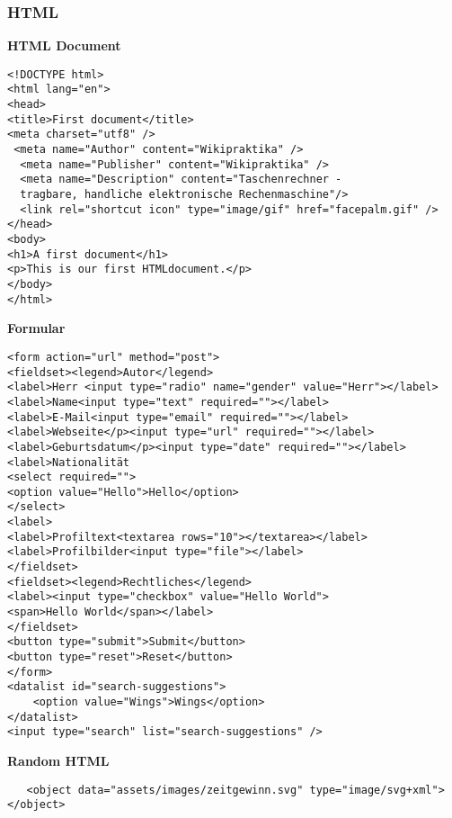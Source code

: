 

\thispagestyle{fancy}
\raggedright
\footnotesize
\raggedcolumns
\begin{multicols*}{4}
\setlength{\premulticols}{1pt}
\setlength{\postmulticols}{1pt}
\setlength{\multicolsep}{1pt}
\setlength{\columnsep}{2pt}
\tiny

\subsubsection{HTML}

\textbf{HTML Document}
 \begin{verbatim}
<!DOCTYPE html>
<html lang="en"> 
<head>
<title>First document</title>
<meta charset="utf­8" /> 
 <meta name="Author" content="Wikipraktika" />
  <meta name="Publisher" content="Wikipraktika" />
  <meta name="Description" content="Taschenrechner - 
  tragbare, handliche elektronische Rechenmaschine"/>
  <link rel="shortcut icon" type="image/gif" href="facepalm.gif" />
</head>
<body>
<h1>A first document</h1>
<p>This is our first HTML­document.</p> 
</body>
</html>
\end{verbatim}

\textbf{Formular}
 \begin{verbatim}
<form action="url" method="post">
<fieldset><legend>Autor</legend>
<label>Herr <input type="radio" name="gender" value="Herr"></label>
<label>Name<input type="text" required=""></label>
<label>E-Mail<input type="email" required=""></label>
<label>Webseite</p><input type="url" required=""></label>
<label>Geburtsdatum</p><input type="date" required=""></label>
<label>Nationalität
<select required="">
<option value="Hello">Hello</option>
</select>
<label>
<label>Profiltext<textarea rows="10"></textarea></label>
<label>Profilbilder<input type="file"></label>
</fieldset>
<fieldset><legend>Rechtliches</legend>
<label><input type="checkbox" value="Hello World">
<span>Hello World</span></label>
</fieldset>
<button type="submit">Submit</button>
<button type="reset">Reset</button>
</form>
<datalist id="search-suggestions">
	<option value="Wings">Wings</option>
</datalist>
<input type="search" list="search-suggestions" />
\end{verbatim}
\textbf{Random HTML}
 \begin{verbatim}
   <object data="assets/images/zeitgewinn.svg" type="image/svg+xml"></object>
 \end{verbatim}


\end{multicols*}
